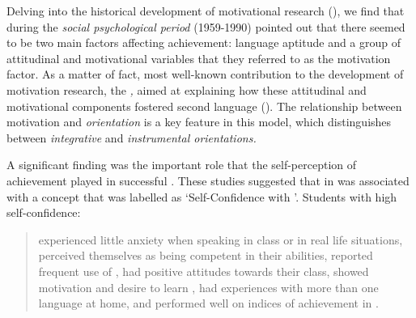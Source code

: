 \documentclass[output=paper]{langsci/langscibook}
\begin{document}
Delving into the historical development of  motivational research (\citealt{DörnyeiUshioda2011}), we find that during the \textit{social psychological period} (1959-1990) \citet{GardnerLambert1959} pointed out  that there seemed to  be  two main factors affecting  achievement: language aptitude and a group of attitudinal and motivational variables that they referred to as the motivation factor. As a matter of fact,  most well-known contribution to the development of motivation research, the \textit{,} aimed at explaining how these attitudinal and motivational components fostered second language  (). The relationship between motivation and \textit{orientation} is a key feature in this model, which distinguishes between \textit{integrative} and \textit{instrumental orientations.} 



A significant finding was the important role that the self-perception of  achievement played in successful . These studies suggested that  in  was associated with a concept that was labelled as ‘Self-Confidence with ’. Students with high self-confidence:


\begin{quote}
experienced little anxiety when speaking  in class or in real life situations, perceived themselves as being competent in their  abilities, reported frequent use of , had positive attitudes towards their  class, showed motivation and desire to learn , had experiences with more than one language at home, and performed well on indices of achievement in . \citep[24]{SampasivamClément2014}
\end{quote}
\end{document}
